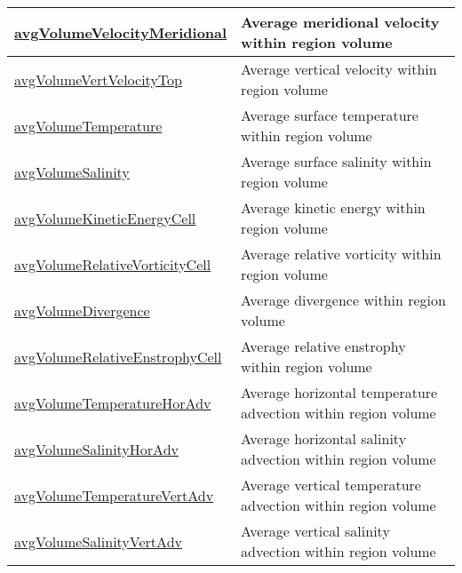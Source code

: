 {\begin{center}
\begin{longtable}{| p{2.0in} | p{4.0in} |}
    \hline
    \hyperref[subsec:var_sec_layerVolumeWeightedAverageAM_avgVolumeVelocityMeridional]{avgVolumeVelocityMeridional} & Average meridional velocity within region volume \\
    \hline
    \hyperref[subsec:var_sec_layerVolumeWeightedAverageAM_avgVolumeVertVelocityTop]{avgVolumeVertVelocityTop} & Average vertical velocity within region volume \\
    \hline
    \hyperref[subsec:var_sec_layerVolumeWeightedAverageAM_avgVolumeTemperature]{avgVolumeTemperature} & Average surface temperature within region volume \\
    \hline
    \hyperref[subsec:var_sec_layerVolumeWeightedAverageAM_avgVolumeSalinity]{avgVolumeSalinity} & Average surface salinity within region volume \\
    \hline
    \hyperref[subsec:var_sec_layerVolumeWeightedAverageAM_avgVolumeKineticEnergyCell]{avgVolumeKineticEnergyCell} & Average kinetic energy within region volume \\
    \hline
    \hyperref[subsec:var_sec_layerVolumeWeightedAverageAM_avgVolumeRelativeVorticityCell]{avgVolumeRelativeVorticityCell} & Average relative vorticity within region volume \\
    \hline
    \hyperref[subsec:var_sec_layerVolumeWeightedAverageAM_avgVolumeDivergence]{avgVolumeDivergence} & Average divergence within region volume \\
    \hline
    \hyperref[subsec:var_sec_layerVolumeWeightedAverageAM_avgVolumeRelativeEnstrophyCell]{avgVolumeRelativeEnstrophyCell} & Average relative enstrophy within region volume \\
    \hline
    \hyperref[subsec:var_sec_layerVolumeWeightedAverageAM_avgVolumeTemperatureHorAdv]{avgVolumeTemperatureHorAdv} & Average horizontal temperature advection within region volume \\
    \hline
    \hyperref[subsec:var_sec_layerVolumeWeightedAverageAM_avgVolumeSalinityHorAdv]{avgVolumeSalinityHorAdv} & Average horizontal salinity advection within region volume \\
    \hline
    \hyperref[subsec:var_sec_layerVolumeWeightedAverageAM_avgVolumeTemperatureVertAdv]{avgVolumeTemperatureVertAdv} & Average vertical temperature advection within region volume \\
    \hline
    \hyperref[subsec:var_sec_layerVolumeWeightedAverageAM_avgVolumeSalinityVertAdv]{avgVolumeSalinityVertAdv} & Average vertical salinity advection within region volume \\

\end{longtable}
\end{center}}

